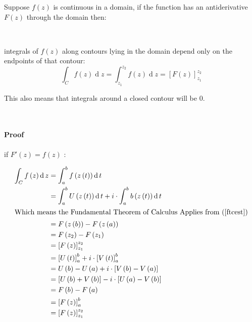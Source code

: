 \documentclass[class=article, crop=false]{standalone}
\begin{document}
Suppose \(f\left( z \right)\) is continuous in a domain, if the function
has an antiderivative \(F\left( z \right)\) through the domain then:

~~

integrals of \(f\left( z \right)\) along contours lying in the domain
depend only on the endpoints of that contour:
\[\int^{}_{C}f\left( z \right)  \operatorname{d}z = \int^{z_2}_{z_1} f\left( z \right)   \operatorname{d}z = \left[ F\left( z \right)  \right]^{z_2}_{z_1}\]

This also means that integrals around a closed contour will be 0.

~~

\hypertarget{proof}{%
\paragraph{Proof}\label{proof}}

if \(F'\left( z \right) = f\left( z \right)\) :

\begin{align*}
       \int^{}_{C} f\left( z \right)   \operatorname{d}z &=  \int^{b}_{a} f\left( z\left( t \right)  \right)   \operatorname{d}t \\
       &= \int^{b}_{a} U\left( z\left( t \right)  \right)   \operatorname{d}t + i\cdot \int^{b}_{a} b\left( z\left( t \right)  \right)   \operatorname{d}t\\
       \intertext{Which means the Fundamental Theorem of Calculus Applies from (\ref{ftcest})}
       &= F\left( z\left( b \right)  \right) - F\left( z\left( a \right)  \right) \\
       &=  F\left( z_2 \right) - F\left( z_1 \right) \\
       &= \left[ F\left( z \right)  \right]^{z_2}_{z_1} \\
       &= \left[ U\left( t \right)  \right]^{b}_{a} +  i \cdot  \left[ V\left( t \right)  \right]^{b}_{a} \\
       &= U\left( b \right) - U\left( a \right) +  i \cdot  \left[ V\left( b \right) - V\left( a \right)  \right] \\
       &= \left[ U\left( b \right)+  V\left( b   \right)  \right] -  i \cdot  \left[ U\left( a \right) - V\left( b \right)  \right] \\
       &= F\left( b \right) - F\left( a \right) \\
       &= \left[ F\left( z \right)  \right]^{b}_{a}\\
       &= \left[ F\left( z \right)  \right]^{z_2}_{z_1}
 \end{align*}
\end{document}
